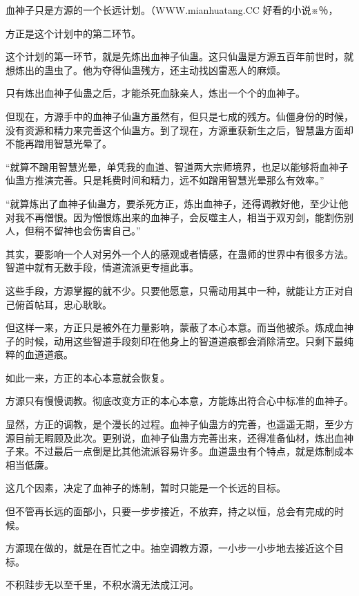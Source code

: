 
\begin{this_body}

血神子只是方源的一个长远计划。（WWW.mianhuatang.CC 好看的小说※％，

方正是这个计划中的第二环节。

这个计划的第一环节，就是先炼出血神子仙蛊。这只仙蛊是方源五百年前世时，就想炼出的蛊虫了。他为夺得仙蛊残方，还主动找凶雷恶人的麻烦。

只有炼出血神子仙蛊之后，才能杀死血脉亲人，炼出一个个的血神子。

但现在，方源手中的血神子仙蛊方虽然有，但只是七成的残方。仙僵身份的时候，没有资源和精力来完善这个仙蛊方。到了现在，方源重获新生之后，智慧蛊方面却不能再蹭用智慧光晕了。

“就算不蹭用智慧光晕，单凭我的血道、智道两大宗师境界，也足以能够将血神子仙蛊方推演完善。只是耗费时间和精力，远不如蹭用智慧光晕那么有效率。”

“就算炼出了血神子仙蛊方，要杀死方正，炼出血神子，还得调教好他，至少让他对我不再憎恨。因为憎恨炼出来的血神子，会反噬主人，相当于双刃剑，能割伤别人，但稍不留神也会伤害自己。”

其实，要影响一个人对另外一个人的感观或者情感，在蛊师的世界中有很多方法。智道中就有无数手段，情道流派更专擅此事。

这些手段，方源掌握的就不少。只要他愿意，只需动用其中一种，就能让方正对自己俯首帖耳，忠心耿耿。

但这样一来，方正只是被外在力量影响，蒙蔽了本心本意。而当他被杀。炼成血神子的时候，动用这些智道手段刻印在他身上的智道道痕都会消除清空。只剩下最纯粹的血道道痕。

如此一来，方正的本心本意就会恢复。

方源只有慢慢调教。彻底改变方正的本心本意，方能炼出符合心中标准的血神子。

显然，方正的调教，是个漫长的过程。血神子仙蛊方的完善，也遥遥无期，至少方源目前无暇顾及此次。更别说，血神子仙蛊方完善出来，还得准备仙材，炼出血神子来。不过最后一点倒是比其他流派容易许多。血道蛊虫有个特点，就是炼制成本相当低廉。

这几个因素，决定了血神子的炼制，暂时只能是一个长远的目标。

但不管再长远的面部小，只要一步步接近，不放弃，持之以恒，总会有完成的时候。

方源现在做的，就是在百忙之中。抽空调教方源，一小步一小步地去接近这个目标。

不积跬步无以至千里，不积水滴无法成江河。


\end{this_body}

